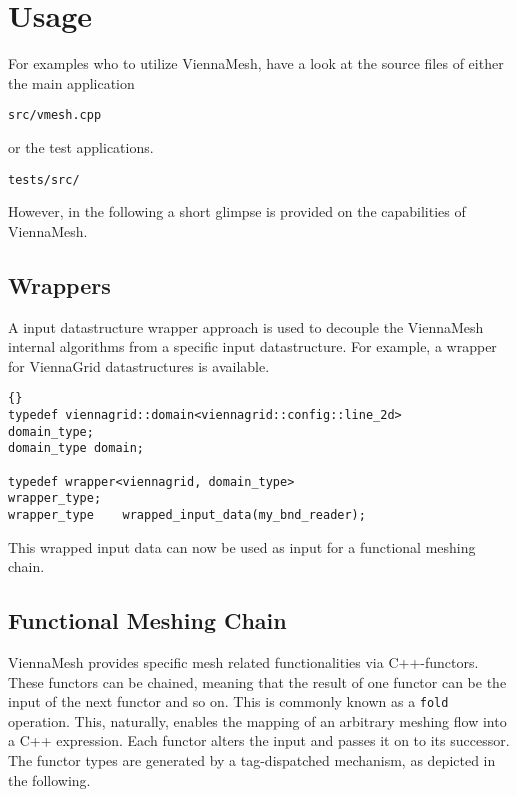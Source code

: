 
\section{Usage} 

For examples who to utilize ViennaMesh, have a look at the source files 
of either the main application

\begin{exaipd}
\begin{Verbatim}
src/vmesh.cpp
\end{Verbatim}
\end{exaipd}

or the test applications.

\begin{exaipd}
\begin{Verbatim}
tests/src/
\end{Verbatim}
\end{exaipd}

However, in the following a short glimpse is provided on the capabilities of 
ViennaMesh. 

\subsection{Wrappers}
A input datastructure wrapper approach is used to decouple the 
ViennaMesh internal algorithms from a specific input datastructure.
For example, a wrapper for ViennaGrid datastructures is available.

\begin{lstlisting}{}
typedef viennagrid::domain<viennagrid::config::line_2d>     domain_type;
domain_type domain;

typedef wrapper<viennagrid, domain_type>                    wrapper_type;
wrapper_type    wrapped_input_data(my_bnd_reader);      
\end{lstlisting}

This wrapped input data can now be used as input for a functional meshing chain.

\subsection{Functional Meshing Chain}

ViennaMesh provides specific mesh related functionalities via C++-functors. 
These functors can be chained, meaning that the result of one functor 
can be the input of the next functor and so on. This is commonly known as 
a \texttt{fold} operation.
This, naturally, enables the mapping of an arbitrary meshing flow into 
a C++ expression. Each functor alters the input and passes it on to its 
successor. The functor types are generated by a tag-dispatched mechanism, 
as depicted in the following.

